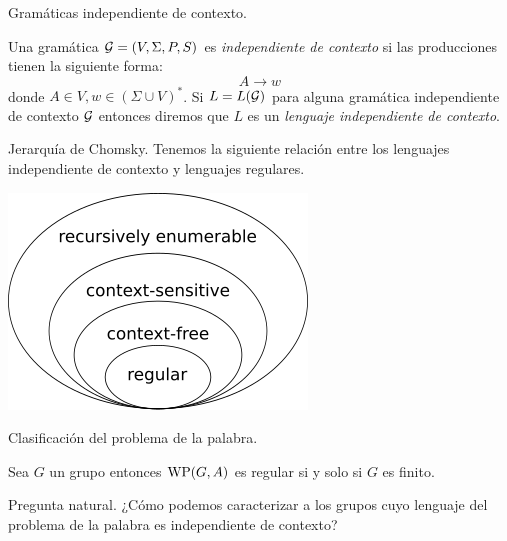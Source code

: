 \documentclass[aspectratio=169, 11pt]{beamer}
\begin{document}
	\begin{frame}{Gramáticas independiente de contexto.}
		\begin{deff}
			Una gramática ${\cal G} = (V, \Sigma, P, S) $ es \emph{independiente de contexto} si las producciones tienen la siguiente forma:
			\begin{equation*}
				A \to w
			\end{equation*}
			donde $A \in V, w \in (\Sigma \cup V)^*$.  
			Si $L=L({\cal G})$ para alguna gramática independiente de contexto $\cal G$ entonces diremos que $L$ es un \emph{lenguaje independiente de contexto}.
		\end{deff}
		
	\end{frame}

	\begin{frame}{Jerarquía de Chomsky.}
		Tenemos la siguiente relación entre los lenguajes independiente de contexto y lenguajes regulares.


			\centering
			\includegraphics[scale = 0.65]{Chomsky-hierarchy.png}
		
	\end{frame}

	\begin{frame}[fragile]{Clasificación del problema de la palabra.}
		
		\begin{teo}[Animisov--1971]
			Sea $G$ un grupo entonces $\text{WP}(G, A)$ es regular si y solo si $G$ es finito.
		\end{teo}

		\begin{alertblock}{Pregunta natural.}
			¿Cómo podemos caracterizar a los grupos cuyo lenguaje del problema de la palabra es independiente de contexto?
		\end{alertblock}
	\end{frame}
	
\end{document}
